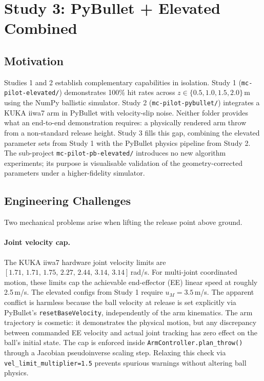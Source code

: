 \section{Study 3: PyBullet + Elevated Combined}
\label{sec:study3}

\subsection{Motivation}

Studies 1 and 2 establish complementary capabilities in isolation.
Study 1 (\texttt{mc-pilot-elevated/}) demonstrates 100\% hit rates across
$z \in \{0.5, 1.0, 1.5, 2.0\}$\,m using the NumPy ballistic simulator.
Study 2 (\texttt{mc-pilot-pybullet/}) integrates a KUKA iiwa7 arm in PyBullet with
velocity-slip noise.
Neither folder provides what an end-to-end demonstration requires: a physically
rendered arm throw from a non-standard release height.
Study 3 fills this gap, combining the elevated parameter sets from Study 1 with the
PyBullet physics pipeline from Study 2.
The sub-project \texttt{mc-pilot-pb-elevated/} introduces no new algorithm
experiments; its purpose is visualisable validation of the geometry-corrected
parameters under a higher-fidelity simulator.

\subsection{Engineering Challenges}
\label{sec:study3:challenges}

Two mechanical problems arise when lifting the release point above ground.

\paragraph{Joint velocity cap.}
The KUKA iiwa7 hardware joint velocity limits are
$[1.71,\, 1.71,\, 1.75,\, 2.27,\, 2.44,\, 3.14,\, 3.14]$\,rad/s.
For multi-joint coordinated motion, these limits cap the achievable end-effector
(EE) linear speed at roughly 2.5\,m/s.
The elevated configs from Study 1 require $u_M = 3.5$\,m/s.
The apparent conflict is harmless because the ball velocity at release is set
explicitly via PyBullet's \texttt{resetBaseVelocity}, independently of the arm
kinematics.
The arm trajectory is cosmetic: it demonstrates the physical motion, but any
discrepancy between commanded EE velocity and actual joint tracking has zero effect
on the ball's initial state.
The cap is enforced inside \texttt{ArmController.plan\_throw()} through a Jacobian
pseudoinverse scaling step.
Relaxing this check via \texttt{vel\_limit\_multiplier=1.5} prevents spurious
warnings without altering ball physics.

